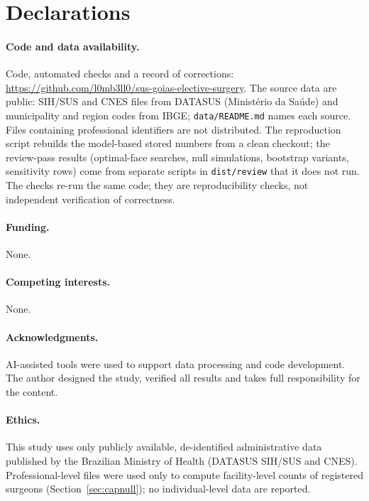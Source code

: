 \documentclass[11pt]{article}
\begin{document}
\section*{Declarations}
\paragraph{Code and data availability.} Code, automated checks and a record of corrections: \url{https://github.com/l0mb3ll0/sus-goias-elective-surgery}. The source data are public: SIH/SUS and CNES files from DATASUS (Minist\'erio da Sa\'ude) and municipality and region codes from IBGE; \texttt{data/README.md} names each source. Files containing professional identifiers are not distributed. The reproduction script rebuilds the model-based stored numbers from a clean checkout; the review-pass results (optimal-face searches, null simulations, bootstrap variants, sensitivity rows) come from separate scripts in \texttt{dist/review} that it does not run. The checks re-run the same code; they are reproducibility checks, not independent verification of correctness.
\paragraph{Funding.} None.
\paragraph{Competing interests.} None.
\paragraph{Acknowledgments.} AI-assisted tools were used to support data processing and code development. The author designed the study, verified all results and takes full responsibility for the content.
\paragraph{Ethics.} This study uses only publicly available, de-identified administrative data published by the Brazilian Ministry of Health (DATASUS SIH/SUS and CNES). Professional-level files were used only to compute facility-level counts of registered surgeons (Section~\ref{sec:capnull}); no individual-level data are reported.



\end{document}
